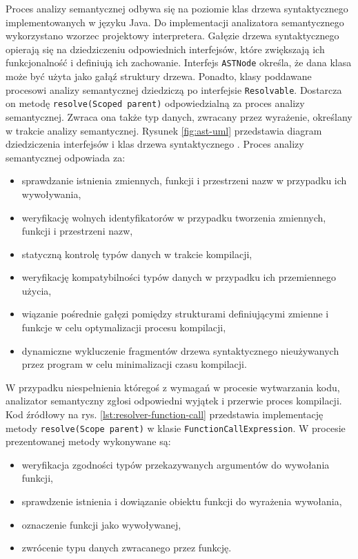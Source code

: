 Proces analizy semantycznej odbywa się na poziomie klas drzewa syntaktycznego implementowanych w języku Java. Do implementacji analizatora semantycznego wykorzystano wzorzec projektowy interpretera. Gałęzie drzewa syntaktycznego opierają się na dziedziczeniu odpowiednich interfejsów, które zwiększają ich funkcjonalność i definiują ich zachowanie. Interfejs \lstinline|ASTNode| określa, że dana klasa może być użyta jako gałąź struktury drzewa. Ponadto, klasy poddawane procesowi analizy semantycznej dziedziczą po interfejsie \lstinline|Resolvable|. Dostarcza on metodę \lstinline|resolve(Scoped parent)| odpowiedzialną za proces analizy semantycznej. Zwraca ona także typ danych, zwracany przez wyrażenie, określany w trakcie analizy semantycznej. Rysunek \ref{fig:ast-uml} przedstawia diagram dziedziczenia interfejsów i klas drzewa syntaktycznego . Proces analizy semantycznej odpowiada za:
\begin{itemize}
\item sprawdzanie istnienia zmiennych, funkcji i przestrzeni nazw w przypadku ich wywoływania,
\item weryfikację wolnych identyfikatorów w przypadku tworzenia zmiennych, funkcji i przestrzeni nazw,
\item statyczną kontrolę typów danych w trakcie kompilacji,
\item weryfikację kompatybilności typów danych w przypadku ich przemiennego użycia,
\item wiązanie pośrednie gałęzi pomiędzy strukturami definiującymi zmienne i funkcje w celu optymalizacji procesu kompilacji,
\item dynamiczne wykluczenie fragmentów drzewa syntaktycznego nieużywanych przez program w celu minimalizacji czasu kompilacji.
\end{itemize}
W przypadku niespełnienia któregoś z wymagań w procesie wytwarzania kodu, analizator semantyczny zgłosi odpowiedni wyjątek i przerwie proces kompilacji. Kod źródłowy na rys.  \ref{lst:resolver-function-call} przedstawia implementację metody \lstinline|resolve(Scope parent)| w klasie \mbox{\lstinline|FunctionCallExpression|.} W procesie prezentowanej metody wykonywane są:
\begin{itemize}
\item weryfikacja zgodności typów przekazywanych argumentów do wywołania funkcji,
\item sprawdzenie istnienia i dowiązanie obiektu funkcji do wyrażenia wywołania,
\item oznaczenie funkcji jako wywoływanej,
\item zwrócenie typu danych zwracanego przez funkcję.
\end{itemize}
